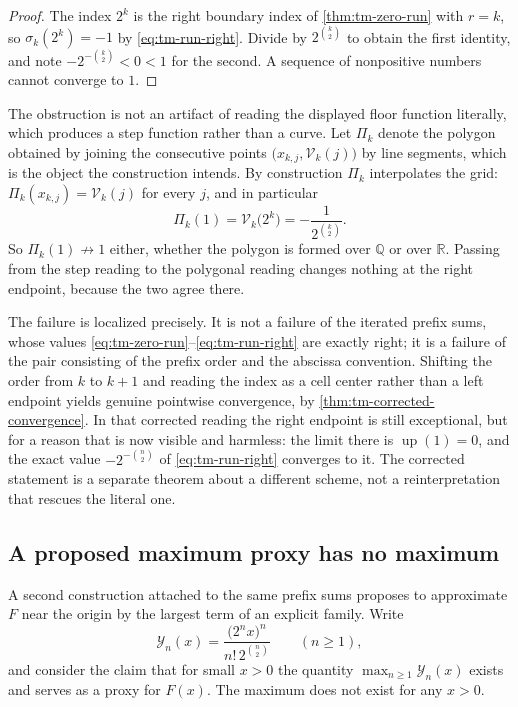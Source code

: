 \documentclass[11pt,oneside]{article}
\theoremstyle{definition}
\theoremstyle{remark}
\newcommand{\R}{\mathbb R}
\newcommand{\Q}{\mathbb Q}
\newcommand{\Up}{\operatorname{up}}
\begin{document}
\begin{proof}
The index $2^k$ is the right boundary index of \cref{thm:tm-zero-run} with $r=k$, so
$\sigma_k(2^k)=-1$ by \eqref{eq:tm-run-right}.  Divide by $2^{\binom k2}$ to obtain the
first identity, and note $-2^{-\binom k2}<0<1$ for the second.  A sequence of nonpositive
numbers cannot converge to $1$.
\end{proof}

The obstruction is not an artifact of reading the displayed floor function literally, which
produces a step function rather than a curve.  Let $\Pi_k$ denote the polygon obtained by
joining the consecutive points $\bigl(x_{k,j},\mathcal V_k(j)\bigr)$ by line segments, which
is the object the construction intends.  By construction $\Pi_k$ interpolates the grid:
$\Pi_k(x_{k,j})=\mathcal V_k(j)$ for every $j$, and in particular
\begin{equation}
 \Pi_k(1)=\mathcal V_k\bigl(2^k\bigr)=-\frac1{2^{\binom k2}}.
                                                          \label{eq:tm-polygon-endpoint}
\end{equation}
So $\Pi_k(1)\not\to1$ either, whether the polygon is formed over $\Q$ or over $\R$.  Passing
from the step reading to the polygonal reading changes nothing at the right endpoint,
because the two agree there.

The failure is localized precisely.  It is not a failure of the iterated prefix sums, whose
values \eqref{eq:tm-zero-run}--\eqref{eq:tm-run-right} are exactly right; it is a failure of
the pair consisting of the prefix order and the abscissa convention.  Shifting the order
from $k$ to $k+1$ and reading the index as a cell center rather than a left endpoint yields
genuine pointwise convergence, by \cref{thm:tm-corrected-convergence}.  In that corrected
reading the right endpoint is still exceptional, but for a reason that is now visible and
harmless: the limit there is $\Up(1)=0$, and the exact value $-2^{-\binom n2}$ of
\eqref{eq:tm-run-right} converges to it.  The corrected statement is a separate theorem
about a different scheme, not a reinterpretation that rescues the literal one.

\subsection{A proposed maximum proxy has no maximum}
\label{tm:sub-max-proxy}

A second construction attached to the same prefix sums proposes to approximate $F$ near the
origin by the largest term of an explicit family.  Write
\begin{equation}
 \mathcal Y_n(x)=\frac{\bigl(2^nx\bigr)^n}{n!\,2^{\binom n2}}\qquad(n\ge1),
                                                          \label{eq:tm-proxy}
\end{equation}
and consider the claim that for small $x>0$ the quantity $\max_{n\ge1}\mathcal Y_n(x)$ exists and
serves as a proxy for $F(x)$.  The maximum does not exist for any $x>0$.
\end{document}
